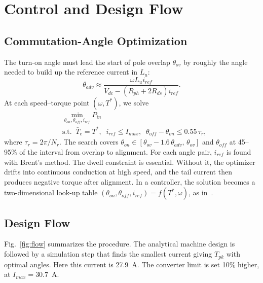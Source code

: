 \documentclass[journal]{IEEEtran}
\begin{document}
\section{Control and Design Flow}
\label{sec:flow}

\subsection{Commutation-Angle Optimization}
The turn-on angle must lead the start of pole overlap $\theta_{ov}$ by roughly
the angle needed to build up the reference current in $L_u$:
\begin{equation}
\theta_{adv}\approx \frac{\omega L_u i_{ref}}{V_{dc}-(R_{ph}+2R_{ds})i_{ref}}.
\label{eq:adv}
\end{equation}
At each speed--torque point $(\omega,T^*)$, we solve
\begin{equation}
\begin{aligned}
&\min_{\theta_{on},\theta_{off},i_{ref}} P_{in}\\
&\text{s.t.}\;\; \bar T_e=T^*,\;\; i_{ref}\le I_{max},\;\; \theta_{off}-\theta_{on}\le 0.55\,\tau_r,
\end{aligned}
\label{eq:opt}
\end{equation}
where $\tau_r=2\pi/N_r$. The search covers
$\theta_{on}\in[\theta_{ov}-1.6\,\theta_{adv},\,\theta_{ov}]$ and $\theta_{off}$
at 45--95\% of the interval from overlap to alignment. For each angle pair,
$i_{ref}$ is found with Brent's method. The dwell constraint is essential.
Without it, the optimizer drifts into continuous conduction at high speed, and the
tail current then produces negative torque after alignment. In a controller,
the solution becomes a two-dimensional look-up table
$(\theta_{on},\theta_{off},i_{ref})=f(T^*,\omega)$, as in~\cite{kjaer1997,xue2010}.

\subsection{Design Flow}
Fig.~\ref{fig:flow} summarizes the procedure. The analytical machine design is
followed by a simulation step that finds the smallest current giving
$T_{pk}$ with optimal angles. Here this current is 27.9~A. The converter
limit is set 10\% higher, at $I_{max}=30.7$~A.
\end{document}
